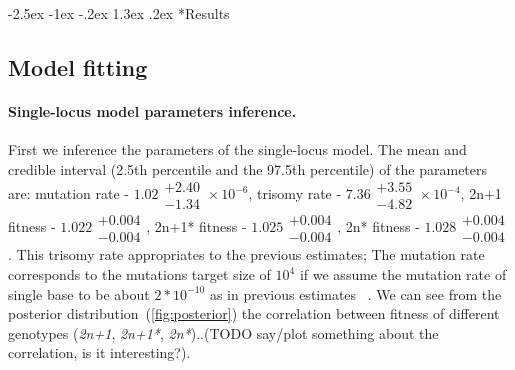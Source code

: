 \documentclass[12pt]{extarticle}
\makeatletter
\renewcommand\section{\@startsection {section}{1}{\z@}%
     {-2.5ex \@plus -1ex \@minus -.2ex}%
     {1.3ex \@plus.2ex}%
    {\Large\bfseries}}
\newcommand{\anwt}{\emph{2n+1}}
\newcommand{\eumt}{\emph{2n*}}
\newcommand{\anmt}{\emph{2n+1*}}
\makeatother
\begin{document}
\pagebreak
\section*{Results}

\subsection*{Model fitting}


\paragraph{Single-locus model parameters inference.} 
First we inference the parameters of the single-locus model. The mean and credible interval (2.5th percentile and the 97.5th percentile) of the parameters are:
mutation rate - $1.02\substack{+2.40 \\ -1.34}\times10^{-6}$,
trisomy rate - $7.36\substack{+3.55 \\ -4.82}\times10^{-4}$,
2n+1 fitness - $1.022\substack{+0.004 \\ -0.004}$,
2n+1* fitness - $1.025\substack{+0.004 \\ -0.004}$,
2n* fitness - $1.028\substack{+0.004 \\ -0.004}$.
This trisomy rate appropriates to the previous estimates; The mutation rate corresponds to the mutations target size of $10^{4}$ if we assume the mutation rate of single base to be about $2*10^{-10}$ as in previous estimates ~\citep{Zhu2014}. 
We can see from the posterior distribution~(\autoref{fig:posterior}) the correlation between fitness of different genotypes (\anwt, \anmt, \eumt)..(TODO say/plot something about the correlation, is it interesting?). 
\end{document}
